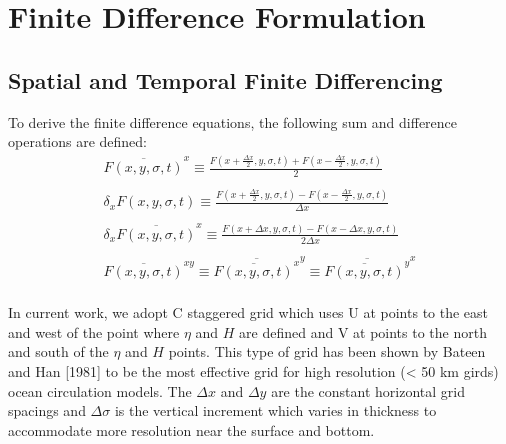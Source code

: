 \documentclass[oribibl]{llncs}
\begin{document}
\section{Finite Difference Formulation}

\subsection{Spatial and Temporal Finite Differencing}

To derive the finite difference equations, the following sum and difference operations are defined:
\begin{eqnarray}
\overline{F(x,y,\sigma,t)}^x \equiv \frac{F(x+\frac{\Delta x}{2}, y, \sigma, t) + F(x-\frac{\Delta x}{2}, y, \sigma, t)}{2} \\
\nonumber \\
\delta_x {F(x,y,\sigma,t)} \equiv \frac{F(x+\frac{\Delta x}{2}, y, \sigma, t) - F(x-\frac{\Delta x}{2}, y, \sigma, t)}{\Delta x} \\
\nonumber \\
\delta_x \overline{F(x,y,\sigma,t)}^x \equiv \frac{F(x+\Delta x, y, \sigma, t) - F(x-\Delta x, y, \sigma, t)}{2\Delta x} \\
\nonumber \\
\overline{F(x,y,\sigma,t)}^{xy} \equiv \overline{\overline{F(x,y,\sigma,t)}^x}^y \equiv \overline{\overline{F(x,y,\sigma,t)}^y}^x\\
\end{eqnarray}

In current work, we adopt C staggered grid which uses U at points to the east and west of the point where $\eta$ and $H$ are defined and V at points to the north and south of the $\eta$ and $H$ points. This type of grid has been shown by Bateen and Han [1981] to be the most effective grid for high resolution (< 50 km girds) ocean circulation models. The $\Delta x$ and $\Delta y$ are the constant horizontal grid spacings and $\Delta \sigma$ is the vertical increment which varies in thickness to accommodate more resolution near the surface and bottom.
 
\end{document}
